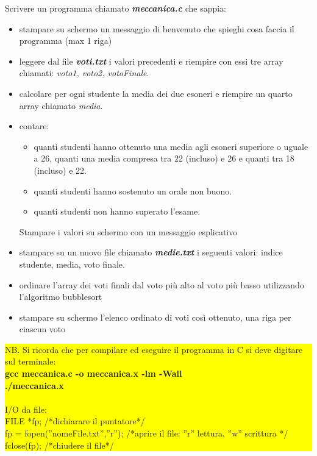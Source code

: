 \documentclass[12pt]{article}
\begin{document}
Scrivere un programma chiamato \textbf{\emph{meccanica.c}} che sappia:
\begin{itemize}
\item stampare su schermo un messaggio di benvenuto che spieghi cosa faccia il programma (max 1 riga)
\item leggere dal file \textbf{\emph{voti.txt}} i valori precedenti e riempire con essi tre array chiamati: \emph{voto1, voto2, votoFinale}.
\item calcolare per ogni studente la media dei due esoneri e riempire un quarto array chiamato \emph{media}. 

\item contare:
\begin{itemize}
\item  quanti studenti hanno ottenuto una media agli esoneri superiore o uguale a 26, quanti una media compresa tra 22 (incluso) e 26 e quanti tra 18 (incluso) e 22. 
\item  quanti studenti hanno sostenuto un  orale non buono.
\item  quanti studenti non hanno superato l'esame.

\end{itemize}
Stampare i valori su schermo con un messaggio esplicativo


\item stampare su un nuovo file chiamato \textbf{\emph{medie.txt}} i seguenti valori: indice studente, media, voto finale.

\item ordinare l'array dei voti finali dal voto pi\`u alto al voto pi\`u basso utilizzando l'algoritmo bubblesort
\item stampare su schermo l'elenco ordinato di voti cos\`i ottenuto, una riga per ciascun voto

\end{itemize}



\colorbox{yellow}{\begin{minipage}{17cm}
NB. Si ricorda che per compilare ed eseguire il programma in C si deve digitare sul terminale:\\
\textbf{gcc meccanica.c -o meccanica.x -lm -Wall \\
  ./meccanica.x}\\
\\
I/O da file: \\
FILE *fp; /*dichiarare il puntatore*/ \\
fp = fopen(''nomeFile.txt'',''r''); /*aprire il file: ''r'' lettura, ''w'' scrittura */ \\
fclose(fp);  /*chiudere il file*/ \\

\end{minipage}}
\end{document}
